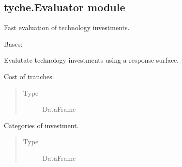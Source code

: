 \documentclass[letterpaper,10pt,english]{sphinxmanual}
\begin{document}
\subsection{tyche.Evaluator module}
\label{\detokenize{tyche:module-tyche.Evaluator}}\label{\detokenize{tyche:tyche-evaluator-module}}
Fast evaluation of technology investments.

\begin{fulllineitems}
\label{\detokenize{tyche:tyche.Evaluator.Evaluator}}
Bases: 

Evalutate technology investments using a response surface.

\begin{fulllineitems}
\label{\detokenize{tyche:tyche.Evaluator.Evaluator.amounts}}
Cost of tranches.
\begin{quote}\begin{description}
\item[{Type}] \leavevmode
DataFrame

\end{description}\end{quote}

\end{fulllineitems}


\begin{fulllineitems}
\label{\detokenize{tyche:tyche.Evaluator.Evaluator.categories}}
Categories of investment.
\begin{quote}\begin{description}
\item[{Type}] \leavevmode
DataFrame

\end{description}\end{quote}


\end{fulllineitems}
\end{fulllineitems}
\end{document}
